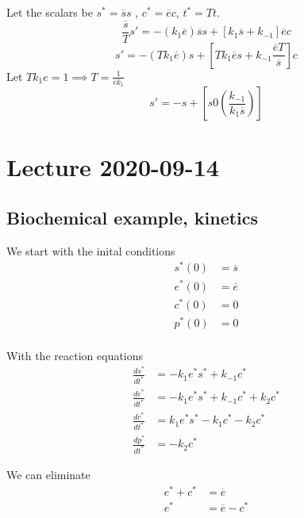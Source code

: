 \documentclass{article}
\theoremstyle{remark}
\newcommand{\newpara}
  {
  \vskip 0.4cm
  }
\begin{document}
\begin{enumerate}[label=(\roman*)]
 
 \newpara
 
 Let the scalars be $s ^{*} = \overline{s}  s$ , $c ^{*} = \overline{e}  c$, $t ^{* } = Tt$. \[
 \frac{\overline{s} }{T}  s'  = - \left( k_{1} \overline{e}  \right) \overline{s}  s + \left[ k_{1} \overline{s}  + k_{-1}  \right] \overline{e}  c
 \] 
 \[
   s'  = - \left(T k_{1} \overline{e}  \right)  s + \left[ Tk_{1} \overline{e} s  + k_{-1} \frac{\overline{e}  T}{\overline{s} }   \right]   c
 \] 
 Let $ \displaystyle Tk_{1} e = 1  \implies  T = \frac{1}{\overline{e}  k_{1}} $ \[
 s'  = -s + \left[ s 0 \left( \frac{k_{-1}}{k_{1}\overline{s} }  \right) \right]
 \] 
 
 


\newpage
\section{Lecture 2020-09-14}%
\label{sec:lecture_2020_09_14}

\subsection{Biochemical example, kinetics}%
\label{sub:biochemical_example_kinetics}

We start with the inital conditions \[
\begin{split}
  s ^{*} \left(  0 \right)  & = \overline{s}  \\
  e ^{* } \left( 0 \right) &=  \overline{e}  \\
  c ^{*} \left( 0 \right) &=  0 \\
  p^{*} \left( 0 \right) &=  0 \\
\end{split} 
\] 

With the reaction equations 
\begin{align}
  \label{eq:li}
  \frac{d s ^{*} }{d  t^{*}}  &=  -k_{1} e ^{*} s ^{*} + k_{-1} c ^{*} \\
  \frac{d e^{*}}{d t^{*}}  &=  -k_{1} e^{*} s ^{*} + k_{-1} c ^{*} + k_{2} c^{*} \\
  \frac{d c ^{*}}{d t^{*}}  &=  k_{1} e ^{*} s ^{* } - k_{1} c ^{*} - k_{2} c ^{*} \\
  \frac{d p ^{*}}{d t^{*} }  &=  -k_{2} c ^{*} 
\end{align}
 
We can eliminate \[
  \begin{split}
e ^{*} + c ^{*} &=  \overline{e}  \\
e ^{*}  & = \overline{e}  - c ^{*}
  \end{split} 
\] 


\end{enumerate}
\end{document}
